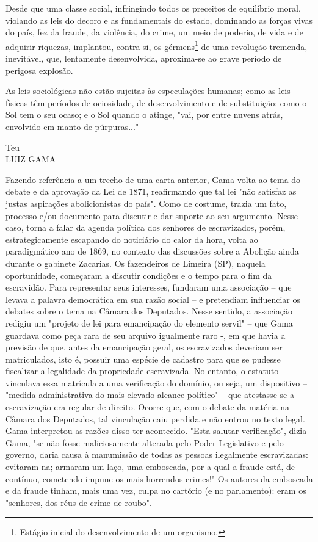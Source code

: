 Desde que uma classe social, infringindo todos os preceitos de
equilíbrio moral, violando as leis do decoro e as fundamentais do
estado, dominando as forças vivas do país, fez da fraude, da violência,
do crime, um meio de poderio, de vida e de adquirir riquezas, implantou,
contra si, os gérmens\footnote{Estágio inicial do desenvolvimento de
  um organismo.} de uma
revolução tremenda, inevitável, que, lentamente desenvolvida,
aproxima-se ao grave período de perigosa explosão.

As leis sociológicas não estão sujeitas às especulações humanas; como as
leis físicas têm períodos de ociosidade, de desenvolvimento e de
substituição: como o Sol tem o seu ocaso; e o Sol quando o atinge, "vai,
por entre nuvens atrás, envolvido em manto de púrpuras..."

Teu\\
LUIZ GAMA

\pagebreak
\mbox{}\vfill
\thispagestyle{empty}

{\small\noindent
Fazendo referência a um trecho de uma carta anterior, Gama volta
ao tema do debate e da aprovação da Lei de 1871, reafirmando que tal lei
"não satisfaz as justas aspirações abolicionistas do país". Como de
costume, trazia um fato, processo e/ou documento para discutir e dar
suporte ao seu argumento. Nesse caso, torna a falar da agenda política
dos senhores de escravizados, porém, estrategicamente escapando do
noticiário do calor da hora, volta ao paradigmático ano de 1869, no
contexto das discussões sobre a Abolição ainda durante o gabinete
Zacarias. Os fazendeiros de Limeira (SP), naquela oportunidade,
começaram a discutir condições e o tempo para o fim da escravidão. Para
representar seus interesses, fundaram uma associação -- que levava a
palavra democrática em sua razão social -- e pretendiam influenciar os
debates sobre o tema na Câmara dos Deputados. Nesse sentido, a
associação redigiu um "projeto de lei para emancipação do elemento
servil" -- que Gama guardava como peça rara de seu arquivo igualmente
raro -, em que havia a previsão de que, antes da emancipação geral, os
escravizados deveriam ser matriculados, isto é, possuir uma espécie de
cadastro para que se pudesse fiscalizar a legalidade da propriedade
escravizada. No entanto, o estatuto vinculava essa matrícula a uma
verificação do domínio, ou seja, um dispositivo -- "medida
administrativa do mais elevado alcance político" -- que atestasse se a
escravização era regular de direito. Ocorre que, com o debate da matéria
na Câmara dos Deputados, tal vinculação caiu perdida e não entrou no
texto legal. Gama interpretou as razões disso ter acontecido. "Esta
salutar verificação", dizia Gama, "se não fosse maliciosamente alterada
pelo Poder Legislativo e pelo governo, daria causa à manumissão de todas
as pessoas ilegalmente escravizadas: evitaram-na; armaram um laço, uma
emboscada, por a qual a fraude está, de contínuo, cometendo impune os
mais horrendos crimes!" Os autores da emboscada e da fraude tinham, mais
uma vez, culpa no cartório (e no parlamento): eram os "senhores, dos
réus de crime de roubo".}

